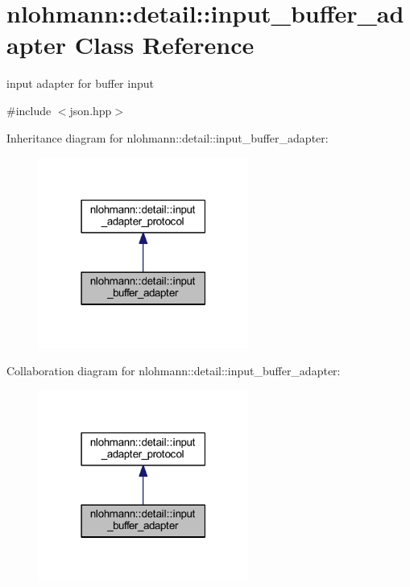 \hypertarget{classnlohmann_1_1detail_1_1input__buffer__adapter}{}\section{nlohmann\+::detail\+::input\+\_\+buffer\+\_\+adapter Class Reference}
\label{classnlohmann_1_1detail_1_1input__buffer__adapter}


input adapter for buffer input  




{\ttfamily \#include $<$json.\+hpp$>$}



Inheritance diagram for nlohmann\+::detail\+::input\+\_\+buffer\+\_\+adapter\+:
\nopagebreak
\begin{figure}[H]
\begin{center}
\leavevmode
\includegraphics[width=195pt]{classnlohmann_1_1detail_1_1input__buffer__adapter__inherit__graph}
\end{center}
\end{figure}


Collaboration diagram for nlohmann\+::detail\+::input\+\_\+buffer\+\_\+adapter\+:
\nopagebreak
\begin{figure}[H]
\begin{center}
\leavevmode
\includegraphics[width=195pt]{classnlohmann_1_1detail_1_1input__buffer__adapter__coll__graph}
\end{center}
\end{figure}
